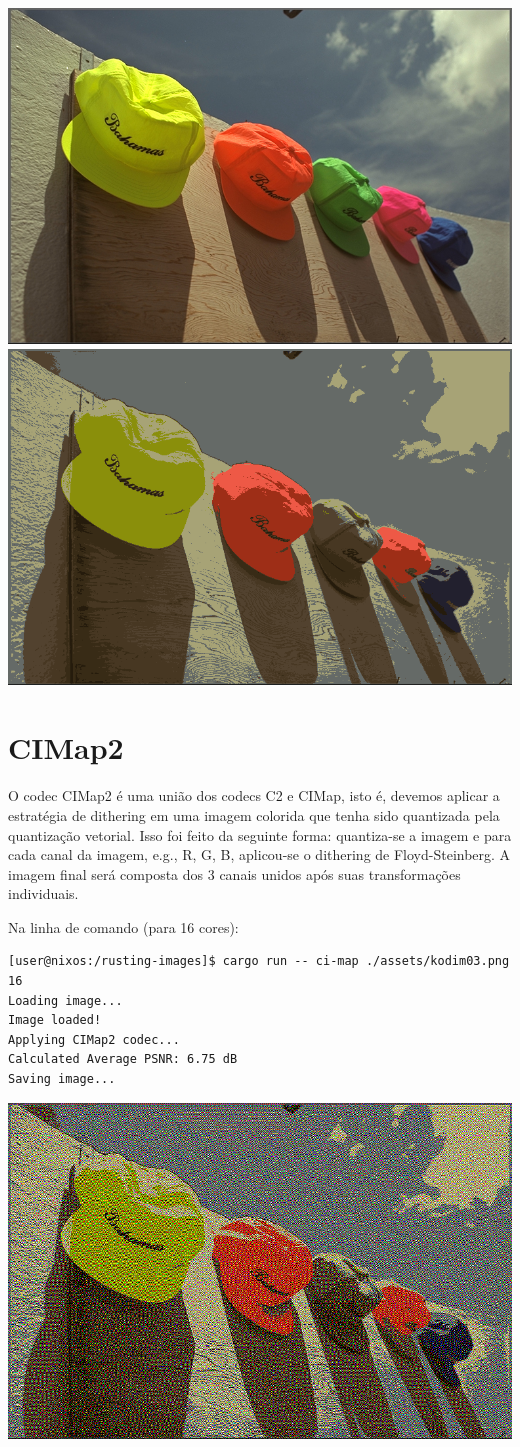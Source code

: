 \documentclass[11pt]{article}
\begin{document}
\begin{center}
\includegraphics[height=0.3\textwidth]{../assets/kodim03_32.jpg}
\includegraphics[height=0.3\textwidth]{../assets/kodim03_cimap_32.png}
\end{center}

\section{CIMap2}
\label{sec:orga467619}

O codec CIMap2 é uma união dos codecs C2 e CIMap, isto é, devemos aplicar a estratégia de dithering
em uma imagem colorida que tenha sido quantizada pela quantização vetorial. Isso foi feito da seguinte
forma: quantiza-se a imagem e para cada canal da imagem, e.g., R, G, B, aplicou-se o dithering de Floyd-Steinberg.
A imagem final será composta dos 3 canais unidos após suas transformações individuais.

Na linha de comando (para 16 cores):

\begin{verbatim}
[user@nixos:/rusting-images]$ cargo run -- ci-map ./assets/kodim03.png 16
Loading image...
Image loaded!
Applying CIMap2 codec...
Calculated Average PSNR: 6.75 dB
Saving image...
\end{verbatim}

\begin{center}
\includegraphics[height=0.4\textwidth]{../assets/kodim03_cimap2.png}
\end{center}
\end{document}
